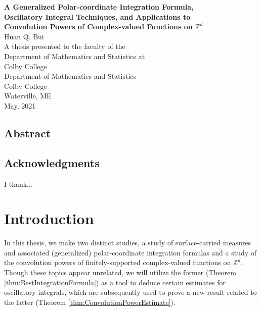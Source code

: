 \documentclass[11pt, letter]{book}
\begin{document}
\thispagestyle{empty}
\begin{center}
{\Large{\textbf{
A Generalized Polar-coordinate Integration Formula, \\
Oscillatory Integral Techniques, and Applications to \\Convolution Powers of Complex-valued Functions on $\mathbb{Z}^d$ 
}}}\\
\vspace{1cm}
{\large{Huan Q. Bui}}\\
\vspace{7cm}
A thesis presented to the faculty of the\\
Department of Mathematics and Statistics at\\
Colby College\\
\vspace{7cm}
Department of Mathematics and Statistics\\
Colby College\\
Waterville, ME\\
May, 2021
\end{center}


\newpage
\section*{Abstract} 




\newpage
\section*{Acknowledgments} 

I thank...


\tableofcontents





\chapter{Introduction}\label{chap:intro}


In this thesis, we make two distinct studies, a study of surface-carried measures and associated (generalized) polar-coordinate integration formulas and a study of the convolution powers of finitely-supported complex-valued functions on $\mathbb{Z}^d$.  Though these topics appear unrelated, we will utilize the former (Theorem \ref{thm:BestIntegrationFormula}) as a tool to deduce certain estimates for oscillatory integrals, which are subsequently used to prove a new result related to the latter  (Theorem \ref{thm:ConvolutionPowerEstimate}). 
\end{document}
